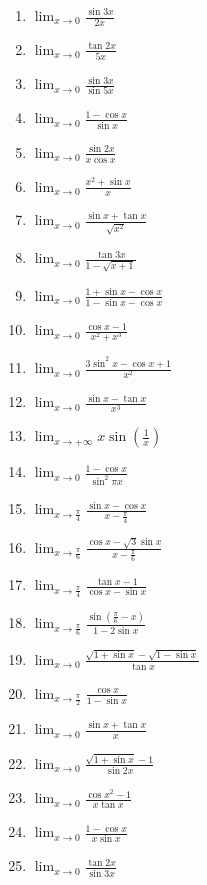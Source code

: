 \documentclass[12pt,a4paper]{article}
\begin{document}
\begin{multicols}{3}
\setlength{\columnseprule}{0.1mm} %
\begin{enumerate}[leftmargin=*]
    \item $\displaystyle \lim_{x \to 0} \frac{\sin 3x}{2x}$
    \item $\displaystyle \lim_{x \to 0} \frac{\tan 2x}{5x}$
    \item $\displaystyle \lim_{x \to 0} \frac{\sin 3x}{\sin 5x}$
    \item $\displaystyle \lim_{x \to 0} \frac{1-\cos x}{\sin x}$
    \item $\displaystyle \lim_{x \to 0} \frac{\sin 2x}{x \cos x}$
    \item $\displaystyle \lim_{x \to 0} \frac{x^2 + \sin x}{x}$
    \item $\displaystyle \lim_{x \to 0} \frac{\sin x + \tan x}{\sqrt{x^2} }$
    \item $\displaystyle \lim_{x \to 0} \frac{\tan 3x}{1 - \sqrt{x + 1}}$
    \item $\displaystyle \lim_{x \to 0} \frac{1 + \sin x - \cos x}{1 - \sin x - \cos x}$
    \item $\displaystyle \lim_{x \to 0} \frac{\cos x - 1}{x^2 + x^3}$
    \item $\displaystyle \lim_{x \to 0} \frac{3\sin^2 x - \cos x + 1}{x^2}$
    \item $\displaystyle \lim_{x \to 0} \frac{\sin x - \tan x}{x^3}$
    \item $\displaystyle \lim_{x \to +\infty} x \sin\left(\frac{1}{x}\right)$ 
    \item $\displaystyle \lim_{x \to 0} \frac{1 - \cos x}{\sin^2 \pi x}$
    \item $\displaystyle \lim_{x \to \frac{\pi}{4}} \frac{\sin x - \cos x}{x - \frac{\pi}{4}}$
    \item $\displaystyle \lim_{x \to \frac{\pi}{6}} \frac{\cos x - \sqrt{3} \sin x}{ x - \frac{\pi}{6}}$
    \item $\displaystyle \lim_{x \to \frac{\pi}{4}} \frac{\tan x - 1}{\cos x - \sin x}$
    \item $\displaystyle \lim_{x \to \frac{\pi}{6}} \frac{\sin\left(\frac{\pi}{6} - x\right)}{1 - 2\sin x}$
    \item $\displaystyle \lim_{x \to 0} \frac{\sqrt{1 + \sin x} - \sqrt{1 - \sin x}}{\tan x}$
    \item $\displaystyle \lim_{x \to \frac{\pi}{2}} \frac{\cos x}{1 - \sin x}$
    \item  $\displaystyle \lim_{x \to 0 }\frac{\sin x + \tan x}{x}$
    \item  $\displaystyle \lim_{x \to 0 }\frac{\sqrt{1+\sin x}-1}{\sin 2x}$
    \item  $\displaystyle \lim_{x \to 0 }\frac{\cos x^2 - 1}{x\tan x}$
    \item  $\displaystyle \lim_{x \to 0 }\frac{1 - \cos x}{x\sin x}$
    \item  $\displaystyle \lim_{x \to 0 }\frac{\tan 2x}{\sin 3x}$
\end{enumerate}
\end{multicols}
\end{document}
